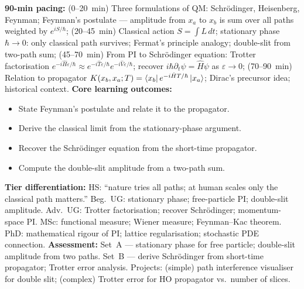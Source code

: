 \documentclass[11pt,a4paper]{article}
\begin{document}
\begin{tcolorbox}[modulebox, title={Module~II.2 / L01: Feynman's Postulate}]
\textbf{90-min pacing:} (0--20~min) Three formulations of QM: Schr\"odinger, Heisenberg, Feynman; Feynman's postulate --- amplitude from $x_a$ to $x_b$ is sum over all paths weighted by $e^{iS/\hbar}$; (20--45~min) Classical action $S=\int L\,dt$; stationary phase $\hbar\to 0$: only classical path survives; Fermat's principle analogy; double-slit from two-path sum; (45--70~min) From PI to Schr\"odinger equation: Trotter factorisation $e^{-i\hat{H}\varepsilon/\hbar}\approx e^{-i\hat{T}\varepsilon/\hbar}e^{-i\hat{V}\varepsilon/\hbar}$; recover $i\hbar\partial_t\psi=\hat{H}\psi$ as $\varepsilon\to 0$; (70--90~min) Relation to propagator $K(x_b,x_a;T)=\bra{x_b}e^{-i\hat{H}T/\hbar}\ket{x_a}$; Dirac's precursor idea; historical context.
\medskip\textbf{Core learning outcomes:}
\begin{itemize}[leftmargin=1.4em,topsep=2pt,itemsep=1pt]
  \item State Feynman's postulate and relate it to the propagator.
  \item Derive the classical limit from the stationary-phase argument.
  \item Recover the Schr\"odinger equation from the short-time propagator.
  \item Compute the double-slit amplitude from a two-path sum.
\end{itemize}
\medskip\textbf{Tier differentiation:}
HS: ``nature tries all paths; at human scales only the classical path matters.''
Beg.\ UG: stationary phase; free-particle PI; double-slit amplitude.
Adv.\ UG: Trotter factorisation; recover Schr\"odinger; momentum-space PI.
MSc: functional measure; Wiener measure; Feynman--Kac theorem.
PhD: mathematical rigour of PI; lattice regularisation; stochastic PDE connection.
\medskip\textbf{Assessment:}
Set~A --- stationary phase for free particle; double-slit amplitude from two paths.
Set~B --- derive Schr\"odinger from short-time propagator; Trotter error analysis.
Projects: (simple) path interference visualiser for double slit; (complex) Trotter error for HO propagator vs.\ number of slices.
\end{tcolorbox}

\medskip
\end{document}
